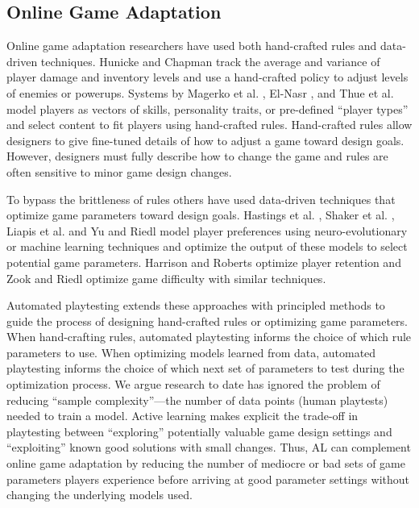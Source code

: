 \documentclass{sig-alternate}
\begin{document}
\subsection{Online Game Adaptation}
Online game adaptation researchers have used both hand-crafted rules and data-driven techniques.
Hunicke and Chapman \cite{hunicke2004:dda} track the average and variance of player damage and inventory levels and use a hand-crafted policy to adjust levels of enemies or powerups. 
Systems by Magerko et al. \cite{magerko2006:isat}, El-Nasr \cite{seifel-nasr2007:mirage}, and Thue et al. \cite{thue2007:storytell-pm} model players as vectors of skills, personality traits, or pre-defined ``player types'' and select content to fit players using hand-crafted rules. %
Hand-crafted rules allow designers to give fine-tuned details of how to adjust a game toward design goals.
However, designers must fully describe how to change the game and rules are often sensitive to minor game design changes.

To bypass the brittleness of rules others have used data-driven techniques that optimize game parameters toward design goals.
Hastings et al. \cite{hastings2009:gar}, Shaker et al. \cite{shaker2013:crowdsource-platform-aesthetics}, Liapis et al. \cite{liapis2013:rank-based-interactive-evol} and Yu and Riedl \cite{yu2013:storyeti} model player preferences using neuro-evolutionary or machine learning techniques and optimize the output of these models to select potential game parameters.
Harrison and Roberts \cite{harrison2013:scrabble-retention} optimize player retention and Zook and Riedl \cite{zook2012:tf} optimize game difficulty with similar techniques.

Automated playtesting extends these approaches with principled methods to guide the process of designing hand-crafted rules or optimizing game parameters.
When hand-crafting rules, automated playtesting informs the choice of which rule parameters to use.
When optimizing models learned from data, automated playtesting informs the choice of which next set of parameters to test during the optimization process.
We argue research to date has ignored the problem of reducing ``sample complexity''---the number of data points (human playtests) needed to train a model.
Active learning makes explicit the trade-off in playtesting between ``exploring'' potentially valuable game design settings and ``exploiting'' known good solutions with small changes.
Thus, AL can complement online game adaptation by reducing the number of mediocre or bad sets of game parameters players experience before arriving at good parameter settings without changing the underlying models used.
\end{document}
